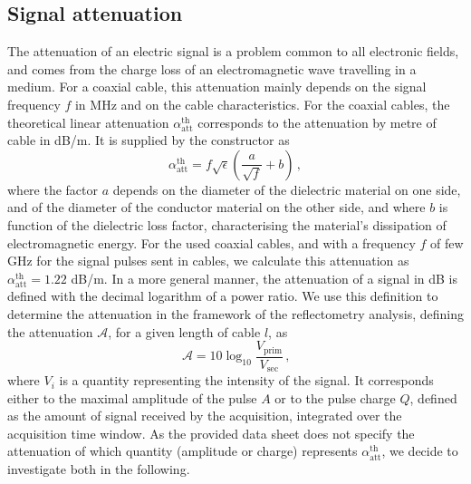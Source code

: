 \subsection{Signal attenuation}
\label{subsec:attenuation}
The attenuation of an electric signal is a problem common to all electronic fields, and comes from the charge loss of an electromagnetic wave travelling in a medium.
For a coaxial cable, this attenuation mainly depends on the signal frequency $f$ in MHz and on the cable characteristics.
For the coaxial cables, the theoretical linear attenuation $\alpha_{\text{att}}^{\text{th}}$ corresponds to the attenuation by metre of cable in dB/m.
It is supplied by the constructor as
\begin{equation}
  \alpha_{\text{att}}^{\text{th}} = f\sqrt{\epsilon}(\frac{a}{\sqrt{f}}+b)\,,
\end{equation}
where the factor $a$ depends on the diameter of the dielectric material on one side, and of the diameter of the conductor material on the other side, and where $b$ is function of the dielectric loss factor, characterising the material's dissipation of electromagnetic energy.
For the used coaxial cables, and with a frequency $f$ of few GHz for the signal pulses sent in cables, we calculate this attenuation as $\alpha_{\text{att}}^{\text{th}} = 1.22$ dB/m.
In a more general manner, the attenuation of a signal in dB is defined with the decimal logarithm of a power ratio.
We use this definition to determine the attenuation in the framework of the reflectometry analysis, defining the attenuation $\mathcal{A}$, for a given length of cable $l$, as
\begin{equation}
  \mathcal{A}=10\log_{10}\frac{V_{\text{prim}}}{V_{\text{sec}}} \,\text{,}
\end{equation}
where $V_{i}$ is a quantity representing the intensity of the signal.
It corresponds either to the maximal amplitude of the pulse $A$ or to the pulse charge $Q$, defined as the amount of signal received by the acquisition, integrated over the acquisition time window.
As the provided data sheet does not specify the attenuation of which quantity (amplitude or charge) represents $\alpha_{\text{att}}^{\text{th}}$, we decide to investigate both in the following.
